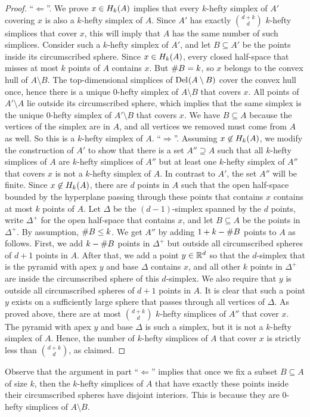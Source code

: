 \documentclass[a4paper,UKenglish,cleveref, autoref,numberwithinsect]{socg-lipics-v2021}
\newcommand {\mm}[1] {\ifmmode{#1}\else{\mbox{\(#1\)}}\fi}
\theoremstyle{plain}
\newcommand{\Rspace}        {\mm{{\mathbb R}}}
\newcommand{\Delaunay}[2]   {\mm{{\rm Del}_{#1}{({#2})}}}
\newcommand{\Hull}[2]       {\mm{{H}_{#1}{({#2})}}}
\newcommand{\card}[1]       {\mm{{\#}{#1}}}
\begin{document}
\begin{proof}
  \smallskip
  ``$\Longleftarrow$''.
  We prove $x \in \Hull{k}{A}$ implies that every $k$-hefty simplex of $A'$ covering $x$ is also a $k$-hefty simplex of $A$.
  Since $A'$ has exactly $\binom{d+k}{d}$ $k$-hefty simplices that cover $x$, this will imply that $A$ has the same number of such simplices.
  Consider such a $k$-hefty simplex of $A'$, and let $B \subseteq A'$ be the points inside its circumscribed sphere.
  Since $x \in \Hull{k}{A}$, every closed half-space that misses at most $k$ points of $A$ contains $x$.
  But $\card{B} = k$, so $x$ belongs to the convex hull of $A \setminus B$.
  The top-dimensional simplices of $\Delaunay{}{A \setminus B}$ cover the convex hull once, hence there is a unique $0$-hefty simplex of $A \setminus B$ that covers $x$.
  All points of $A' \setminus A$ lie outside its circumscribed sphere, which implies that the same simplex is the unique $0$-hefty simplex of $A'\setminus B$ that covers $x$.
  We have $B \subseteq A$ because the vertices of the simplex are in $A$, and all vertices we removed must come from $A$ as well.
  So this is a $k$-hefty simplex of $A$.
  \smallskip
  ``$\Longrightarrow$''.
  Assuming $x \not\in \Hull{k}{A}$, we modify the construction of $A'$ to show that there is a set $A'' \supseteq A$ such that all $k$-hefty simplices of $A$ are $k$-hefty simplices of $A''$ but at least one $k$-hefty simplex of $A''$ that covers $x$ is not a $k$-hefty simplex of $A$.
  In contrast to $A'$, the set $A''$ will be finite.
  Since $x \not\in \Hull{k}{A}$, there are $d$ points in $A$ such that the open half-space bounded by the hyperplane passing through these points that contains $x$ contains at most $k$ points of $A$.
  Let $\Delta$ be the $(d-1)$-simplex spanned by the $d$ points, write $\Delta^+$ for the open half-space that contains $x$, and let $B \subseteq A$ be the points in $\Delta^+$.
  By assumption, $\card{B} \leq k$.
  We get $A''$ by adding $1 + k - \card{B}$ points to $A$ as follows.
  First, we add $k-\card{B}$ points in $\Delta^+$ but outside all circumscribed spheres of $d+1$ points in $A$.
  After that, we add a point $y \in \Rspace^d$ so that the $d$-simplex that is the pyramid with apex $y$ and base $\Delta$ contains $x$, and all
  other $k$ points in $\Delta^+$ are inside the circumscribed sphere of this $d$-simplex. 
  We also require that $y$ is outside all circumscribed spheres of $d+1$ points in $A$.
  It is clear that such a point $y$ exists on a sufficiently large sphere that passes through all vertices of $\Delta$.
  As proved above, there are at most $\binom{d+k}{d}$ $k$-hefty simplices of $A''$ that cover $x$.
  The pyramid with apex $y$ and base $\Delta$ is such a simplex, but it is not a $k$-hefty simplex of $A$.
  Hence, the number of $k$-hefty simplices of $A$ that cover $x$ is strictly less than $\binom{d+k}{d}$, as claimed.
\end{proof}
Observe that the argument in part ``$\Longleftarrow$'' implies that once we fix a subset $B \subseteq A$ of size $k$, then the $k$-hefty simplices of $A$ that have exactly these points inside their circumscribed spheres have disjoint interiors.
This is because they are $0$-hefty simplices of $A \setminus B$.
\end{document}
